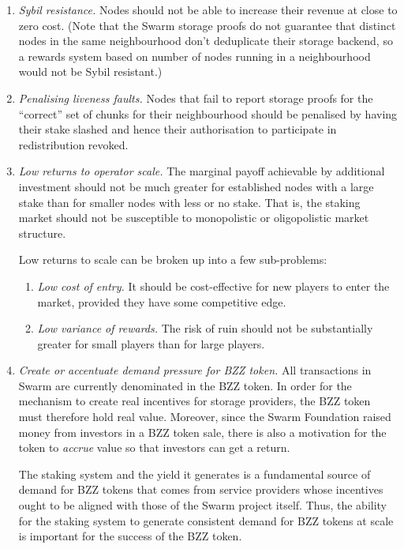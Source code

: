 \begin{enumerate}
  \item \emph{Sybil resistance.} Nodes should not be able to increase their revenue at close to zero cost. (Note that the Swarm storage proofs do not guarantee that distinct nodes in the same neighbourhood don't deduplicate their storage backend, so a rewards system based on number of nodes running in a neighbourhood would not be Sybil resistant.)
  \item \emph{Penalising liveness faults.} Nodes that fail to report storage proofs for the ``correct'' set of chunks for their neighbourhood should be penalised by having their stake slashed and hence their authorisation to participate in redistribution revoked.
  \item \emph{Low returns to operator scale.} The marginal payoff achievable by additional investment should not be much greater for established nodes with a large stake than for smaller nodes with less or no stake. That is, the staking market should not be susceptible to monopolistic or oligopolistic market structure.

  Low returns to scale can be broken up into a few sub-problems:
  \begin{enumerate}
    \item \emph{Low cost of entry.} It should be cost-effective for new players to enter the market, provided they have some competitive edge.
    \item \emph{Low variance of rewards.} The risk of ruin should not be substantially greater for small players than for large players.
  \end{enumerate}
  \item \emph{Create or accentuate demand pressure for BZZ token.} All transactions in Swarm are currently denominated in the BZZ token. In order for the mechanism to create real incentives for storage providers, the BZZ token must therefore hold real value. 
  Moreover, since the Swarm Foundation raised money from investors in a BZZ token sale, there is also a motivation for the token to \emph{accrue} value so that investors can get a return.

  The staking system and the yield it generates is a fundamental source of demand for BZZ tokens that comes from service providers whose incentives ought to be aligned with those of the Swarm project itself.
  Thus, the ability for the staking system to generate consistent demand for BZZ tokens at scale is important for the success of the BZZ token.
\end{enumerate}

